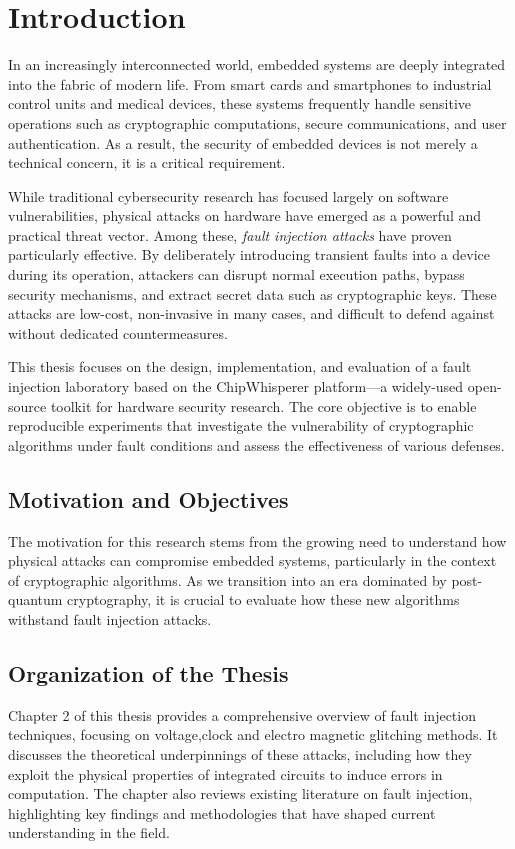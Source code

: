 \chapter{Introduction}


In an increasingly interconnected world, embedded systems are deeply integrated into the fabric of modern life. From smart cards and smartphones to industrial control units and medical devices, these systems frequently handle sensitive operations such as cryptographic computations, secure communications, and user authentication. As a result, the security of embedded devices is not merely a technical concern, it is a critical requirement.

While traditional cybersecurity research has focused largely on software vulnerabilities, physical attacks on hardware have emerged as a powerful and practical threat vector. Among these, \textit{fault injection attacks} have proven particularly effective. By deliberately introducing transient faults into a device during its operation, attackers can disrupt normal execution paths, bypass security mechanisms, and extract secret data such as cryptographic keys. These attacks are low-cost, non-invasive in many cases, and difficult to defend against without dedicated countermeasures.

This thesis focuses on the design, implementation, and evaluation of a fault injection laboratory based on the ChipWhisperer platform—a widely-used open-source toolkit for hardware security research. The core objective is to enable reproducible experiments that investigate the vulnerability of cryptographic algorithms under fault conditions and assess the effectiveness of various defenses.
\section{Motivation and Objectives}
The motivation for this research stems from the growing need to understand how physical attacks can compromise embedded systems, particularly in the context of cryptographic algorithms. As we transition into an era dominated by post-quantum cryptography, it is crucial to evaluate how these new algorithms withstand fault injection attacks. 

\section{Organization of the Thesis}
Chapter 2 of this thesis provides a comprehensive overview of fault injection techniques, focusing on voltage,clock and electro  magnetic glitching methods. It discusses the theoretical underpinnings of these attacks, including how they exploit the physical properties of integrated circuits to induce errors in computation. The chapter also reviews existing literature on fault injection, highlighting key findings and methodologies that have shaped current understanding in the field.

